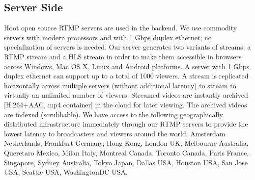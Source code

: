 \subsection{Server Side}
Hoot open source RTMP servers are used in the backend. We use commodity servers with modern processors and with 1 Gbps duplex ethernet;
no specialization of servers is needed. Our server generates two variants of streams: a RTMP stream and a HLS stream in order to make them accessible in browsers across Windows, Mac OS X, Linux and Android platforms. A server with 1 Gbps duplex ethernet can support up to a total of 1000 viewers. A stream is replicated horizontally across multiple servers (without additional latency) to stream to virtually an unlimited number of viewers. 
Streamed videos are instantly archived [H.264+AAC, mp4 container] in the cloud for later viewing. The archived videos are indexed (scrubbable). We have access to the following geographically distributed infrastructure immediately through our RTMP servers to provide the lowest latency to broadcasters and viewers around the world: Amsterdam Netherlands, Frankfurt Germany, Hong Kong, London UK, Melbourne Australia, Queretaro Mexico, Milan Italy, Montreal Canada, Toronto Canada, Paris France, Singapore, Sydney Australia, Tokyo Japan, Dallas USA, Houston USA, San Jose USA, Seattle USA, WashingtonDC USA.

